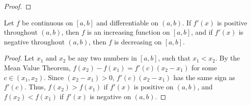 \documentclass[../main.tex]{subfiles}
\begin{document}
\begin{itemize}
\begin{cly}
\begin{proof}
        \end{proof}
    \end{cly}
    \begin{cly}
        Let $f$ be continuous on $[a,b]$ and differentiable on $(a,b)$. If $f'(x)$ is positive throughout $(a,b)$, then $f$ is an increasing function on $[a,b]$, and if $f'(x)$ is negative throughout $(a,b)$, then $f$ is decreasing on $[a,b]$.
        \begin{proof}
            Let $x_1$ and $x_2$ be any two numbers in $[a,b]$, such that $x_1<x_2$. By the Mean Value Theorem, $f(x_2)-f(x_1)=f'(c)(x_2-x_1)$ for some $c\in(x_1,x_2)$. Since $(x_2-x_1)>0$, $f'(c)(x_2-x_1)$ has the same sign as $f'(c)$. Thus, $f(x_2)>f(x_1)$ if $f'(x)$ is positive on $(a,b)$, and $f(x_2)<f(x_1)$ if $f'(x)$ is negative on $(a,b)$.
        \end{proof}
    \end{cly}
\end{itemize}
\end{document}

